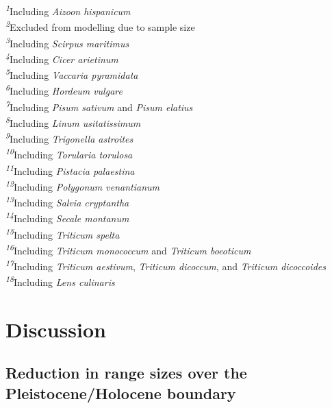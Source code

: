 \documentclass[
  authoryear,
  preprint]{elsarticle}
\begin{document}
\begin{minipage}{\linewidth}
\textsuperscript{\textit{1}}Including \emph{Aizoon hispanicum}\\
\textsuperscript{\textit{2}}Excluded from modelling due to sample size\\
\textsuperscript{\textit{3}}Including \emph{Scirpus maritimus}\\
\textsuperscript{\textit{4}}Including \emph{Cicer arietinum}\\
\textsuperscript{\textit{5}}Including \emph{Vaccaria pyramidata}\\
\textsuperscript{\textit{6}}Including \emph{Hordeum vulgare}\\
\textsuperscript{\textit{7}}Including \emph{Pisum sativum} and \emph{Pisum elatius}\\
\textsuperscript{\textit{8}}Including \emph{Linum usitatissimum}\\
\textsuperscript{\textit{9}}Including \emph{Trigonella astroites}\\
\textsuperscript{\textit{10}}Including \emph{Torularia torulosa}\\
\textsuperscript{\textit{11}}Including \emph{Pistacia palaestina}\\
\textsuperscript{\textit{12}}Including \emph{Polygonum venantianum}\\
\textsuperscript{\textit{13}}Including \emph{Salvia cryptantha}\\
\textsuperscript{\textit{14}}Including \emph{Secale montanum}\\
\textsuperscript{\textit{15}}Including \emph{Triticum spelta}\\
\textsuperscript{\textit{16}}Including \emph{Triticum monococcum} and \emph{Triticum boeoticum}\\
\textsuperscript{\textit{17}}Including \emph{Triticum aestivum}, \emph{Triticum dicoccum}, and \emph{Triticum dicoccoides}\\
\textsuperscript{\textit{18}}Including \emph{Lens culinaris}\\
\end{minipage}
\endgroup

\section{Discussion}\label{discussion}

\subsection{Reduction in range sizes over the Pleistocene/Holocene
boundary}\label{reduction-in-range-sizes-over-the-pleistoceneholocene-boundary}
\end{document}

